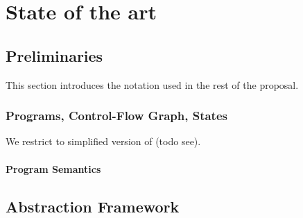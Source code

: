 \chapter{State of the art}
\label{ch:state}



%
%


\section{Preliminaries}

This section introduces the notation used in the rest of the proposal.

\subsection{Programs, Control-Flow Graph, States}

We restrict to simplified version of \llvm (todo see).

\subsubsection{Program Semantics}








\section{Abstraction Framework}

